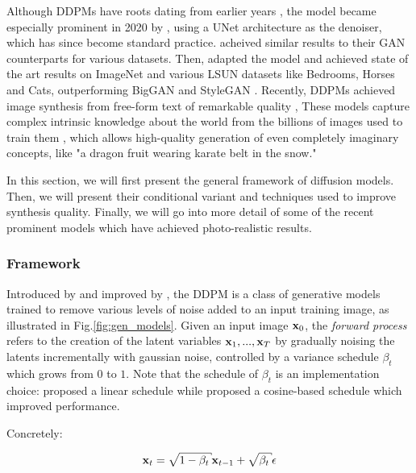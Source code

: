 Although \ac{DDPM}s have roots dating from earlier years \citep{sohl2015deep}, the model became 
especially prominent in 2020 by \cite{ho2020denoising}, using a UNet architecture 
as the denoiser, which has since become standard practice. \cite{ho2020denoising} acheived 
similar results to their 
\ac{GAN} counterparts for various datasets. Then, \cite{dhariwal2021diffusion} adapted 
the model and achieved state of the art results on ImageNet and various LSUN datasets like 
Bedrooms, Horses and Cats, outperforming BigGAN \citep{brock2018large} and StyleGAN \citep{karra2020stylegan2}. 
Recently, \ac{DDPM}s achieved image synthesis from free-form text of remarkable quality \citep{ramesh2022hierarchical, nichol2021glide, saharia2022photorealistic, gafni2022make, rombach2022high}, 
These models capture complex intrinsic knowledge about the world from the billions of images used to train them \citep{schuhmann2022laion}, which 
allows high-quality generation of even completely imaginary concepts, like "a dragon fruit wearing karate belt in the snow."

In this section, we will first present the general framework of diffusion models. Then, we will 
present their conditional variant and techniques used to improve synthesis quality. Finally, 
we will go into more detail of some of the recent prominent models which have achieved photo-realistic 
results.

\subsubsection{Framework}\label{subsec:diffusionmodels_framework}

Introduced by \cite{sohl2015deep} and improved by \cite{ho2020denoising}, the \ac{DDPM} is a class 
of generative models trained to remove various levels of noise added to an input training image, as illustrated in Fig.\ref{fig:gen_models}.
Given an input image $\mathbf{x}_0$, the \emph{forward process} refers to the creation of the latent variables 
$\mathbf{x}_1, ..., \mathbf{x}_T$ by gradually noising the latents incrementally with gaussian noise, controlled by 
a variance schedule ${\beta_t}$ which grows from $0$ to $1$. Note that the schedule of 
$\beta_t$ is an implementation choice: \cite{ho2020denoising} proposed a linear schedule while 
\cite{dhariwal2021diffusion} proposed a cosine-based schedule which improved performance.

Concretely:

\begin{equation}
      \x_t = \sqrt{1 - \beta_t} \x_{t-1} +  \sqrt{\beta_t} \epsilon
\end{equation}

